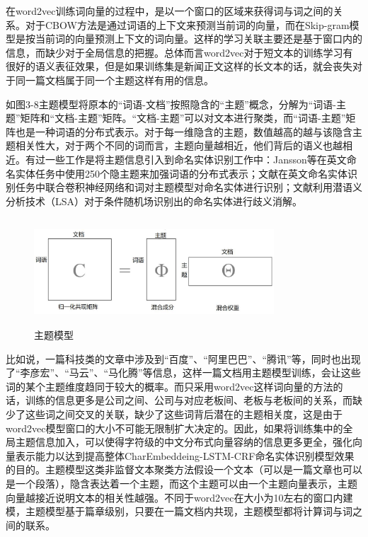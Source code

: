 \documentclass[winfonts,master,oneside,nobackinfo]{njuthesis}
\begin{document}
在word2vec训练词向量的过程中，是以一个窗口的区域来获得词与词之间的关系。对于CBOW方法是通过词语的上下文来预测当前词的向量，而在Skip-gram模型是按当前词的向量预测上下文的词向量。这样的学习关联主要还是基于窗口内的信息，而缺少对于全局信息的把握。总体而言word2vec对于短文本的训练学习有很好的语义表征效果，但是如果训练集是新闻正文这样的长文本的话，就会丧失对于同一篇文档属于同一个主题这样有用的信息。

如图3-8主题模型将原本的“词语-文档”按照隐含的“主题”概念，分解为“词语-主题”矩阵和“文档-主题”矩阵。“文档-主题”可以对文本进行聚类，而“词语-主题”矩阵也是一种词语的分布式表示。对于每一维隐含的主题，数值越高的越与该隐含主题相关性大，对于两个不同的词而言，主题向量越相近，他们背后的语义也越相近。有过一些工作是将主题信息引入到命名实体识别工作中：Jansson等\cite{Jansson}在英文命名实体任务中使用250个隐主题来加强词语的分布式表示；文献\cite{kang}在英文命名实体识别任务中联合卷积神经网络和词对主题模型对命名实体进行识别；文献\cite{gong}利用潜语义分析技术（LSA）对于条件随机场识别出的命名实体进行歧义消解。

\begin{figure}[H]
\centering
\begin{minipage}[t]{\textwidth}
\includegraphics[width=0.8\textwidth,height=4cm]{./figure/主题模型.jpg}
\caption{主题模型}
\label{lab:1}
\end{minipage}
\end{figure}

比如说，一篇科技类的文章中涉及到“百度”、“阿里巴巴”、“腾讯”等，同时也出现了“李彦宏”、“马云”、“马化腾”等信息，这样一篇文档用主题模型训练，会让这些词的某个主题维度趋同于较大的概率。而只采用word2vec这样词向量的方法的话，训练的信息更多是公司之间、公司与对应老板间、老板与老板间的关系，而缺少了这些词之间交叉的关联，缺少了这些词背后潜在的主题相关度，这是由于word2vec模型窗口的大小不可能无限制扩大决定的。因此，如果将训练集中的全局主题信息加入，可以使得字符级的中文分布式向量容纳的信息更多更全，强化向量表示能力以达到提高整体CharEmbeddeing-LSTM-CRF命名实体识别模型效果的目的。主题模型这类非监督文本聚类方法假设一个文本（可以是一篇文章也可以是一个段落），隐含表达着一个主题，而这个主题可以由一个主题向量表示，主题向量越接近说明文本的相关性越强。不同于word2vec在大小为10左右的窗口内建模，主题模型基于篇章级别，只要在一篇文档内共现，主题模型都将计算词与词之间的联系。
\end{document}
